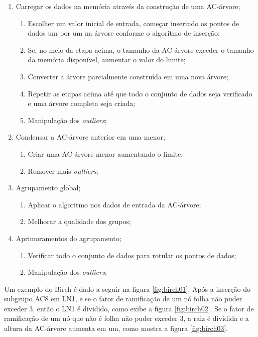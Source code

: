 \begin{enumerate}
    \item Carregar os dados na memória através da construção de uma AC-árvore;
        \begin{enumerate}
            \item Escolher um valor inicial de entrada, começar inserindo os pontos de dados um por um na árvore conforme o algoritmo de inserção;
            \item Se, no meio da etapa acima, o tamanho da AC-árvore exceder o tamanho da memória disponível, aumentar o valor do limite;
            \item Converter a árvore parcialmente construída em uma nova árvore;
            \item Repetir as etapas acima até que todo o conjunto de dados seja verificado e uma árvore completa seja criada;
            \item Manipulação dos \textit{outliers};
        \end{enumerate}
    \item Condensar a AC-árvore anterior em uma menor;
        \begin{enumerate}
            \item Criar uma AC-árvore menor aumentando o limite;
            \item Remover mais \textit{outliers};
        \end{enumerate}
    \item Agrupamento global;
        \begin{enumerate}
            \item Aplicar o algoritmo nos dados de entrada da AC-árvore;
            \item Melhorar a qualidade dos grupos;
        \end{enumerate}    
    \item Aprimoramentos do agrupamento;
        \begin{enumerate}
            \item Verificar todo o conjunto de dados para rotular os pontos de dados;
            \item Manipulação dos \textit{outliers};
        \end{enumerate}    
\end{enumerate}

Um exemplo do Birch é dado a seguir na figura \ref{fig:birch01}. Após a inserção do subgrupo AC8 em LN1, e se o fator de ramificação de um nó folha não puder exceder 3, então o LN1 é dividido, como exibe a figura \ref{fig:birch02}. Se o fator de ramificação de um nó que não é folha não puder exceder 3, a raiz é dividida e a altura da AC-árvore aumenta em um, como mostra a figura \ref{fig:birch03}.

